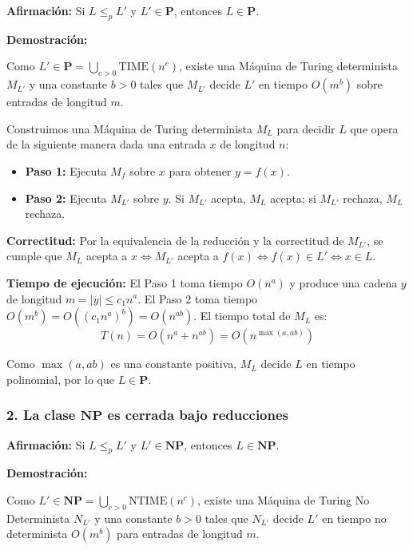 \noindent\textbf{Afirmación:} Si $L \le_p L'$ y $L' \in \mathbf{P}$, entonces $L \in \mathbf{P}$.

\vspace{0.2cm}
\noindent\textbf{Demostración:}

Como $L' \in \mathbf{P} = \bigcup_{c>0} \text{TIME}(n^c)$, existe una Máquina de Turing determinista $M_{L'}$ y una constante $b > 0$ tales que $M_{L'}$ decide $L'$ en tiempo $O(m^b)$ sobre entradas de longitud $m$.

Construimos una Máquina de Turing determinista $M_L$ para decidir $L$ que opera de la siguiente manera dada una entrada $x$ de longitud $n$:
\begin{itemize}[leftmargin=*]
    \item \textbf{Paso 1:} Ejecuta $M_f$ sobre $x$ para obtener $y = f(x)$.
    \item \textbf{Paso 2:} Ejecuta $M_{L'}$ sobre $y$. Si $M_{L'}$ acepta, $M_L$ acepta; si $M_{L'}$ rechaza, $M_L$ rechaza.
\end{itemize}

\noindent\textbf{Correctitud:} Por la equivalencia de la reducción y la correctitud de $M_{L'}$, se cumple que $M_L$ acepta a $x \iff M_{L'}$ acepta a $f(x) \iff f(x) \in L' \iff x \in L$.

\vspace{0.2cm}
\noindent\textbf{Tiempo de ejecución:} El Paso 1 toma tiempo $O(n^a)$ y produce una cadena $y$ de longitud $m = |y| \le c_1 n^a$. El Paso 2 toma tiempo $O(m^b) = O((c_1 n^a)^b) = O(n^{ab})$. El tiempo total de $M_L$ es:
\[ T(n) = O(n^a + n^{ab}) = O(n^{\max(a, ab)}) \]

Como $\max(a, ab)$ es una constante positiva, $M_L$ decide $L$ en tiempo polinomial, por lo que \textbf{$L \in \mathbf{P}$}. 

\subsubsection*{2. La clase $\mathbf{NP}$ es cerrada bajo reducciones}

\noindent\textbf{Afirmación:} Si $L \le_p L'$ y $L' \in \mathbf{NP}$, entonces $L \in \mathbf{NP}$.

\vspace{0.2cm}
\noindent\textbf{Demostración:}

Como $L' \in \mathbf{NP} = \bigcup_{c>0} \text{NTIME}(n^c)$, existe una Máquina de Turing No Determinista $N_{L'}$ y una constante $b > 0$ tales que $N_{L'}$ decide $L'$ en tiempo no determinista $O(m^b)$ para entradas de longitud $m$.

